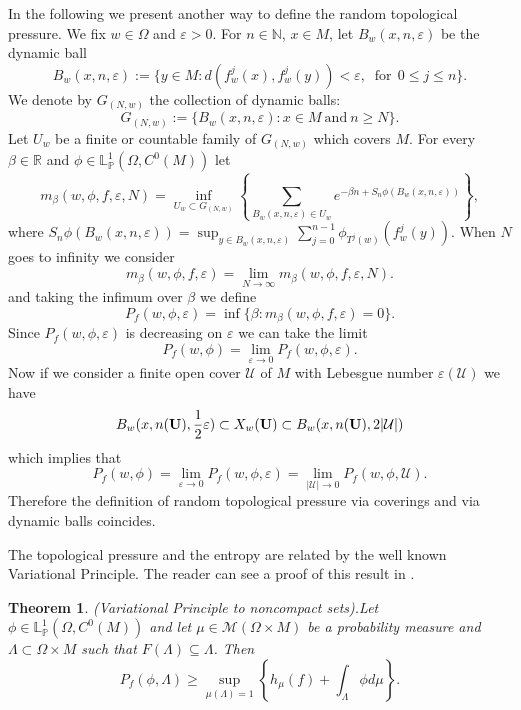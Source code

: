 \documentclass[12pt,a4paper]{amsart}
\theoremstyle{plain}
\newtheorem{theorem}{Theorem}
\begin{document}
	In the following we present another way to define the random topological pressure. We fix $w\in \Omega$ and $\varepsilon>0$. For $n\in \mathbb{N}$, $x\in M$, let $B_{w}(x,n,\varepsilon)$ be the dynamic ball
	\[
	B_{w}(x,n,\varepsilon):=\{y\in M: d(f_{w}^{j}(x),f_{w}^{j}(y) )< \varepsilon, \ \mbox{ for} \ \ 0\leq j \leq n \}.
	\]
	We denote by $G_{(N,w)}$ the collection of dynamic balls:
	\[
	G_{(N,w)}:=\{ B_{w}(x,n,\varepsilon): x\in M \ \mbox{and} \ n\ge N \}.
	\]
	Let $U_w$ be a finite or countable family of $G_{(N,w)}$ which covers $M$. For every $\beta\in \mathbb{R}$ and $\phi \in  \mathbb{L}^{1}_{\mathbb{P}}(\Omega,C^0(M))$ let
	\[
	m_{\beta}(w, \phi, f, \varepsilon, N)=\inf_{U_{w}\subset G_{(N,w)}}\left\{ \sum_{B_{w}(x,n,\varepsilon)\in U_w} e^{-\beta n + S_{n}\phi(B_{w}(x,n,\varepsilon))}  \right\},
	\]
	where $S_{n}\phi(B_{w}(x,n,\varepsilon))=\sup_{y\in B_{w}(x,n,\varepsilon)}\sum_{j=0}^{n-1}\phi_{T^{j}(w)}(f^{j}_{w}(y))$. When $N$ goes to infinity we consider
	\[
	m_{\beta}(w, \phi, f, \varepsilon)=\lim_{N\to \infty}m_{\beta}(w, \phi, f, \varepsilon, N).
	\]
	and taking the infimum over $\beta$ we define
	\[
	P_{f}(w, \phi, \varepsilon)=\inf\{\beta: m_{\beta}(w, \phi, f, \varepsilon)=0 \}.
	\]
	Since $P_{f}(w, \phi, \varepsilon)$ is decreasing on $\varepsilon$ we can take the limit	$$P_{f} (w, \phi)=\lim_{\varepsilon\rightarrow 0} {P_{f} (w, \phi, \varepsilon)}.$$
	Now if we consider a finite open cover $\mathcal{U}$ of $M$ with Lebesgue number $\varepsilon(\mathcal{U})$ we have 
	$$B_w(x, n({\bf U}), \frac{1}{2}\varepsilon)\subset X_w({\bf U})\subset B_w(x, n({\bf U}), 2|\mathcal {U}|)$$
	which implies that $$P_{f} (w, \phi)=\lim_{\varepsilon\rightarrow 0} {P_{f} (w, \phi, \varepsilon)}=\lim_{|\mathcal{U}|\rightarrow 0} {P_{f} (w, \phi, \mathcal{U})}.$$
	Therefore the definition of random topological pressure via coverings and via dynamic balls coincides.
	
	The topological pressure and the entropy are related by the well known Variational Principle. The reader can see a proof of this result in \cite{SSV}.
	
	\begin{theorem}{(Variational Principle to noncompact sets).}\label{VP}
		Let $\phi\in \mathbb{L}^{1}_{\mathbb{P}}(\Omega,C^0(M))$ and let $\mu\in \mathcal{M}(\Omega\times M)$ be a probability measure  and $\Lambda \subset \Omega \times M$ such that $F(\Lambda)\subseteq \Lambda$. Then
		$$
		P_{f}(\phi,\Lambda) \geq \sup_{\mu(\Lambda)=1} \left\{ h_{\mu}(f) + \int_{\Lambda} \phi d\mu  \right\}.
		$$
	\end{theorem}
	
\end{document}
